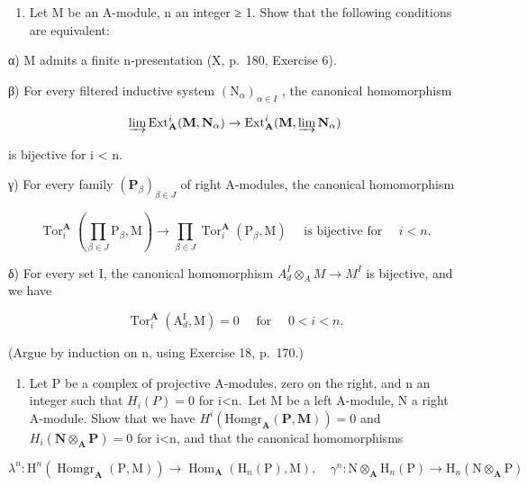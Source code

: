 \begin{enumerate}
\def\labelenumi{\arabic{enumi})}
\setcounter{enumi}{2}
\tightlist
\item
  Let M be an A-module, n an integer ≥ 1. Show that the following conditions are equivalent:
\end{enumerate}

α) M admits a finite n-presentation (X, p.~180, Exercise 6).

β) For every filtered inductive system \((\mathrm{N}_{\alpha})_{\alpha\in I}\) , the canonical homomorphism

\[
\varinjlim \operatorname{Ext} _ {\mathbf {A}} ^ {i} (\mathbf {M}, \mathbf {N} _ {\alpha}) \rightarrow \operatorname{Ext} _ {\mathbf {A}} ^ {i} (\mathbf {M}, \varinjlim \mathbf {N} _ {\alpha})
\]

is bijective for i \textless{} n.

γ) For every family \((\mathbf{P}_{\beta})_{\beta \in J}\) of right A-modules, the canonical homomorphism

\[
\operatorname{Tor} _ {i} ^ {\mathbf {A}} \left(\prod_ {\beta \in J} \mathrm{P} _ {\beta}, \mathrm{M}\right)\rightarrow \prod_ {\beta \in J} \operatorname{Tor} _ {i} ^ {\mathbf {A}} \left(\mathrm{P} _ {\beta}, \mathrm{M}\right) \quad \text { is   bijective   for } \quad i <   n.
\]

δ) For every set I, the canonical homomorphism \(A_{d}^{I} \otimes_{A} M \to M^{I}\) is bijective, and we have

\[
\operatorname{Tor} _ {i} ^ {\mathbf {A}} \left(\mathrm{A} _ {d} ^ {\mathrm{I}}, \mathrm{M}\right) = 0 \quad \text { for } \quad 0 <   i <   n.
\]

(Argue by induction on n, using Exercise 18, p.~170.)

\begin{enumerate}
\def\labelenumi{\arabic{enumi})}
\setcounter{enumi}{3}
\tightlist
\item
  Let P be a complex of projective A-modules, zero on the right, and n an integer such that \(H_{i}(P)=0\) for i\textless n.~Let M be a left A-module, N a right A-module. Show that we have \(H^{i}(\mathrm{Homgr}_{\mathbf{A}}(\mathbf{P},\mathbf{M}))=0\) and \(H_{i}(\mathbf{N}\otimes_{\mathbf{A}}\mathbf{P})=0\) for i\textless n, and that the canonical homomorphisms
\end{enumerate}

\[
\lambda^ {n}: \mathrm{H} ^ {n} (\operatorname{Homgr} _ {\mathbf {A}} (\mathrm{P}, \mathrm{M})) \rightarrow \operatorname{Hom} _ {\mathbf {A}} \left(\mathrm{H} _ {n} (\mathrm{P}), \mathrm{M}\right), \quad \gamma^ {n}: \mathrm{N} \otimes_ {\mathbf {A}} \mathrm{H} _ {n} (\mathrm{P}) \rightarrow \mathrm{H} _ {n} (\mathrm{N} \otimes_ {\mathbf {A}} \mathrm{P})
\]

